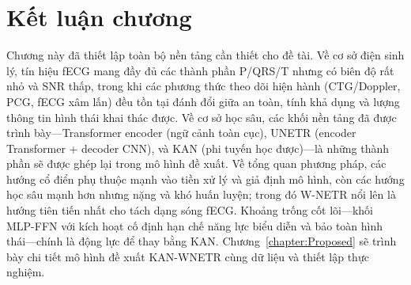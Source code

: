 \documentclass[../DoAn.tex]{subfiles}
\begin{document}
\section{Kết luận chương}

Chương này đã thiết lập toàn bộ nền tảng cần thiết cho đề tài. Về cơ sở điện sinh lý, tín hiệu fECG mang đầy đủ các thành phần P/QRS/T nhưng có biên độ rất nhỏ và SNR thấp, trong khi các phương thức theo dõi hiện hành (CTG/Doppler, PCG, fECG xâm lấn) đều tồn tại đánh đổi giữa an toàn, tính khả dụng và lượng thông tin hình thái khai thác được. Về cơ sở học sâu, các khối nền tảng đã được trình bày---Transformer encoder (ngữ cảnh toàn cục), UNETR (encoder Transformer + decoder CNN), và KAN (phi tuyến học được)---là những thành phần sẽ được ghép lại trong mô hình đề xuất. Về tổng quan phương pháp, các hướng cổ điển phụ thuộc mạnh vào tiền xử lý và giả định mô hình, còn các hướng học sâu mạnh hơn nhưng nặng và khó huấn luyện; trong đó W-NETR nổi lên là hướng tiên tiến nhất cho tách dạng sóng fECG. Khoảng trống cốt lõi---khối MLP-FFN với kích hoạt cố định hạn chế năng lực biểu diễn và bảo toàn hình thái---chính là động lực để thay bằng KAN. Chương~\ref{chapter:Proposed} sẽ trình bày chi tiết mô hình đề xuất KAN-WNETR cùng dữ liệu và thiết lập thực nghiệm.
\end{document}
